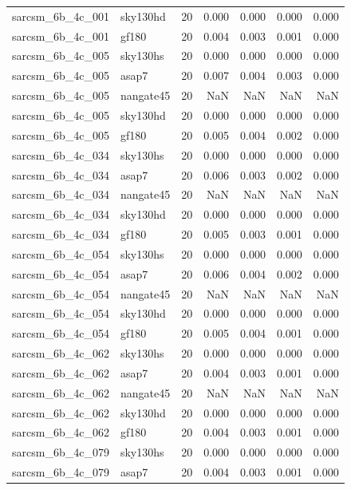 \begin{tabular}{llrrrrr}
sarcsm\_6b\_4c\_001 & sky130hd & 20 & 0.000 & 0.000 & 0.000 & 0.000 \\
sarcsm\_6b\_4c\_001 & gf180 & 20 & 0.004 & 0.003 & 0.001 & 0.000 \\
sarcsm\_6b\_4c\_005 & sky130hs & 20 & 0.000 & 0.000 & 0.000 & 0.000 \\
sarcsm\_6b\_4c\_005 & asap7 & 20 & 0.007 & 0.004 & 0.003 & 0.000 \\
sarcsm\_6b\_4c\_005 & nangate45 & 20 & NaN & NaN & NaN & NaN \\
sarcsm\_6b\_4c\_005 & sky130hd & 20 & 0.000 & 0.000 & 0.000 & 0.000 \\
sarcsm\_6b\_4c\_005 & gf180 & 20 & 0.005 & 0.004 & 0.002 & 0.000 \\
sarcsm\_6b\_4c\_034 & sky130hs & 20 & 0.000 & 0.000 & 0.000 & 0.000 \\
sarcsm\_6b\_4c\_034 & asap7 & 20 & 0.006 & 0.003 & 0.002 & 0.000 \\
sarcsm\_6b\_4c\_034 & nangate45 & 20 & NaN & NaN & NaN & NaN \\
sarcsm\_6b\_4c\_034 & sky130hd & 20 & 0.000 & 0.000 & 0.000 & 0.000 \\
sarcsm\_6b\_4c\_034 & gf180 & 20 & 0.005 & 0.003 & 0.001 & 0.000 \\
sarcsm\_6b\_4c\_054 & sky130hs & 20 & 0.000 & 0.000 & 0.000 & 0.000 \\
sarcsm\_6b\_4c\_054 & asap7 & 20 & 0.006 & 0.004 & 0.002 & 0.000 \\
sarcsm\_6b\_4c\_054 & nangate45 & 20 & NaN & NaN & NaN & NaN \\
sarcsm\_6b\_4c\_054 & sky130hd & 20 & 0.000 & 0.000 & 0.000 & 0.000 \\
sarcsm\_6b\_4c\_054 & gf180 & 20 & 0.005 & 0.004 & 0.001 & 0.000 \\
sarcsm\_6b\_4c\_062 & sky130hs & 20 & 0.000 & 0.000 & 0.000 & 0.000 \\
sarcsm\_6b\_4c\_062 & asap7 & 20 & 0.004 & 0.003 & 0.001 & 0.000 \\
sarcsm\_6b\_4c\_062 & nangate45 & 20 & NaN & NaN & NaN & NaN \\
sarcsm\_6b\_4c\_062 & sky130hd & 20 & 0.000 & 0.000 & 0.000 & 0.000 \\
sarcsm\_6b\_4c\_062 & gf180 & 20 & 0.004 & 0.003 & 0.001 & 0.000 \\
sarcsm\_6b\_4c\_079 & sky130hs & 20 & 0.000 & 0.000 & 0.000 & 0.000 \\
sarcsm\_6b\_4c\_079 & asap7 & 20 & 0.004 & 0.003 & 0.001 & 0.000 \\

\end{tabular}
